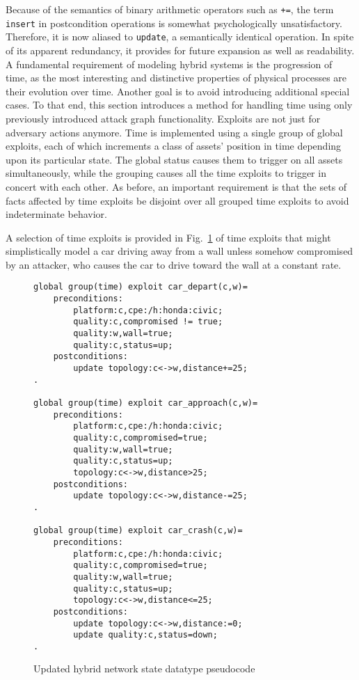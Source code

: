 Because of the semantics of binary arithmetic operators such as \texttt{+=},
the term \texttt{insert} in postcondition operations is somewhat psychologically
unsatisfactory. Therefore, it is now aliased to \texttt{update}, a semantically
identical operation. In spite of its apparent redundancy, it provides for
future expansion as well as readability.
A fundamental requirement of modeling hybrid systems is the progression of
time, as the most interesting and distinctive properties of physical processes
are their evolution over time. Another goal is to avoid introducing additional
special cases. To that end, this section introduces a method for handling time
using only previously introduced attack graph functionality.
Exploits are not just for adversary actions anymore. Time is implemented using
a single group of global exploits, each of which increments a class of assets'
position in time depending upon its particular state. The global status
causes them to trigger on all assets simultaneously, while the grouping causes
all the time exploits to trigger in concert with each other. As before,
an important requirement is that the sets of facts affected by time exploits
be disjoint over all grouped time exploits to avoid indeterminate behavior.

A selection of time exploits is provided in Fig.~\ref{fig:illustrative_time_xp}
of time exploits that might simplistically model
a car driving away from a wall unless somehow compromised by an attacker,
who causes the car to drive toward the wall at a constant rate.

\begin{figure}
\begin{lstlisting}
global group(time) exploit car_depart(c,w)=
    preconditions:
        platform:c,cpe:/h:honda:civic;
        quality:c,compromised != true;
        quality:w,wall=true;
        quality:c,status=up;
    postconditions:
        update topology:c<->w,distance+=25;
.

global group(time) exploit car_approach(c,w)=
    preconditions:
        platform:c,cpe:/h:honda:civic;
        quality:c,compromised=true;
        quality:w,wall=true;
        quality:c,status=up;
        topology:c<->w,distance>25;
    postconditions:
        update topology:c<->w,distance-=25;
.

global group(time) exploit car_crash(c,w)=
    preconditions:
        platform:c,cpe:/h:honda:civic;
        quality:c,compromised=true;
        quality:w,wall=true;
        quality:c,status=up;
        topology:c<->w,distance<=25;
    postconditions:
        update topology:c<->w,distance:=0;
        update quality:c,status=down;
.
\end{lstlisting}
\caption{Updated hybrid network state datatype pseudocode}
\label{fig:illustrative_time_xp}
\end{figure}

